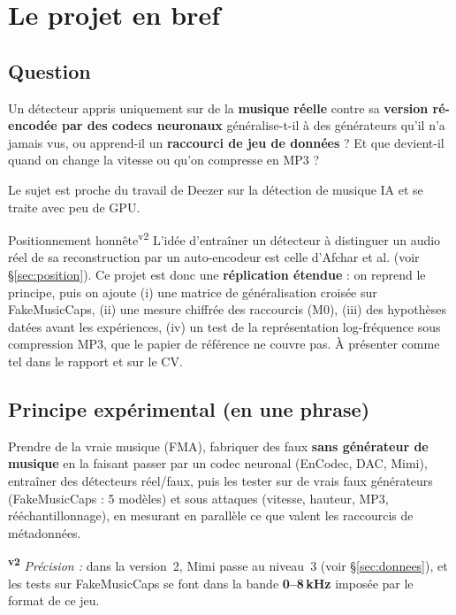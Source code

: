 \documentclass[11pt,a4paper]{article}
\providecommand{\og}{\guillemotleft\nobreakspace}%
\providecommand{\fg}{\nobreakspace\guillemotright}}
\newcommand{\vtwo}{\textsuperscript{\textcolor{orange!80!black}{\textbf{v2}}}}
\newcommand{\vtwot}{\textsuperscript{v2}}  %
\begin{document}
\section{Le projet en bref}\label{sec:s1}

\subsection{Question}\label{sec:question}
Un détecteur appris uniquement sur de la \textbf{musique réelle} contre sa \textbf{version ré-encodée par des codecs neuronaux} généralise-t-il à des générateurs qu'il n'a jamais vus, ou apprend-il un \textbf{raccourci de jeu de données} ? Et que devient-il quand on change la vitesse ou qu'on compresse en MP3 ?

Le sujet est proche du travail de Deezer sur la détection de musique IA et se traite avec peu de GPU.

\begin{corr}{Positionnement honnête\vtwot}
L'idée d'entraîner un détecteur à distinguer un audio réel de sa reconstruction par un auto-encodeur est celle d'Afchar et al. (voir §\ref{sec:position}). Ce projet est donc une \textbf{réplication étendue} : on reprend le principe, puis on ajoute (i) une matrice de généralisation croisée sur FakeMusicCaps, (ii) une mesure chiffrée des raccourcis (M0), (iii) des hypothèses datées avant les expériences, (iv) un test de la représentation log-fréquence sous compression MP3, que le papier de référence ne couvre pas. À présenter comme tel dans le rapport et sur le CV.
\end{corr}

\subsection{Principe expérimental (en une phrase)}\label{sec:principe}
Prendre de la vraie musique (FMA), fabriquer des \og{}faux\fg{} \textbf{sans générateur de musique} en la faisant passer par un codec neuronal (EnCodec, DAC, Mimi), entraîner des détecteurs réel/faux, puis les tester sur de vrais faux générateurs (FakeMusicCaps : 5 modèles) et sous attaques (vitesse, hauteur, MP3, rééchantillonnage), en mesurant en parallèle ce que valent les raccourcis de métadonnées.

\vtwo{} \textit{Précision :} dans la version~2, Mimi passe au niveau~3 (voir §\ref{sec:donnees}), et les tests sur FakeMusicCaps se font dans la bande \textbf{0--8\,kHz} imposée par le format de ce jeu.
\end{document}
